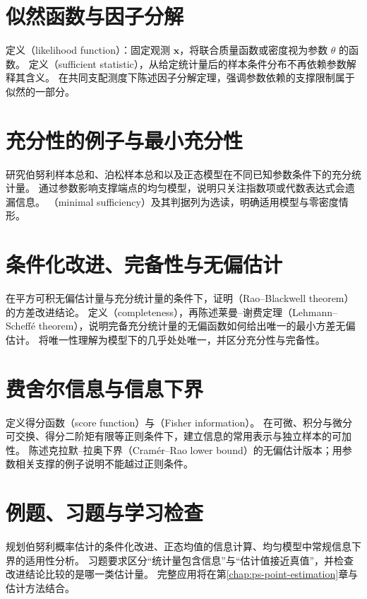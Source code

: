 \documentclass[UTF8,12pt,a4paper,fontset=fandol]{ctexbook}
\begin{document}
\section{似然函数与因子分解}
\label{sec:ps-likelihood-sufficiency}
定义（likelihood function）：固定观测 $\mathbf x$，将联合质量函数或密度视为参数 $\theta$ 的函数。
定义（sufficient statistic），从给定统计量后的样本条件分布不再依赖参数解释其含义。
在共同支配测度下陈述因子分解定理，强调参数依赖的支撑限制属于似然的一部分。

\section{充分性的例子与最小充分性}
\label{sec:ps-minimal-sufficiency}
研究伯努利样本总和、泊松样本总和以及正态模型在不同已知参数条件下的充分统计量。
通过参数影响支撑端点的均匀模型，说明只关注指数项或代数表达式会遗漏信息。
（minimal sufficiency）及其判据列为选读，明确适用模型与零密度情形。

\section{条件化改进、完备性与无偏估计}
\label{sec:ps-rao-blackwell}
在平方可积无偏估计量与充分统计量的条件下，证明（Rao--Blackwell theorem）的方差改进结论。
定义（completeness），再陈述莱曼--谢费定理（Lehmann--Scheffé theorem），说明完备充分统计量的无偏函数如何给出唯一的最小方差无偏估计。
将唯一性理解为模型下的几乎处处唯一，并区分充分性与完备性。

\section{费舍尔信息与信息下界}
\label{sec:ps-fisher-information}
定义得分函数（score function）与（Fisher information）。
在可微、积分与微分可交换、得分二阶矩有限等正则条件下，建立信息的常用表示与独立样本的可加性。
陈述克拉默--拉奥下界（Cramér--Rao lower bound）的无偏估计版本；用参数相关支撑的例子说明不能越过正则条件。

\section{例题、习题与学习检查}
规划伯努利概率估计的条件化改进、正态均值的信息计算、均匀模型中常规信息下界的适用性分析。
习题要求区分“统计量包含信息”与“估计值接近真值”，并检查改进结论比较的是哪一类估计量。
完整应用将在第\ref{chap:ps-point-estimation}章与估计方法结合。
\end{document}
